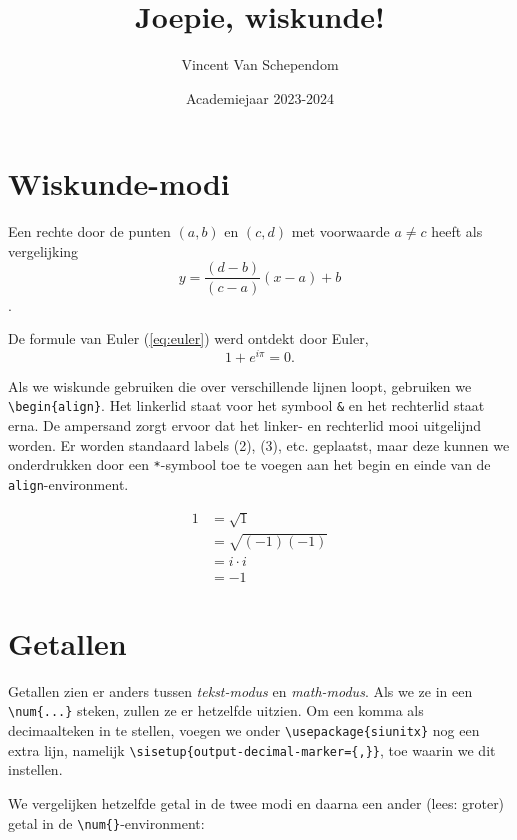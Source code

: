 \documentclass{article}
\title{Joepie, wiskunde!}
\author{Vincent Van Schependom}
\date{Academiejaar 2023-2024}
\begin{document}
	
	\maketitle
	
	\section{Wiskunde-modi}
	
	Een rechte door de punten \((a,b)\) en \((c,d)\) met voorwaarde \(a \neq c\) heeft als vergelijking \[y = \frac{(d-b)}{(c-a)}(x-a)+b\].
	
	De formule van Euler (\ref{eq:euler}) werd ontdekt door Euler,
	\begin{equation}
		\label{eq:euler}
		1+e^{i\pi}=0.
	\end{equation}
	
	Als we wiskunde gebruiken die over verschillende lijnen loopt, gebruiken we \verb|\begin{align}|. Het linkerlid staat voor het symbool \texttt{\&} en het rechterlid staat erna. De ampersand zorgt ervoor dat het linker- en rechterlid mooi uitgelijnd worden. Er worden standaard labels (2), (3), etc. geplaatst, maar deze kunnen we onderdrukken door een \texttt{*}-symbool toe te voegen aan het begin en einde van de \texttt{align}-environment.
		
	\begin{align*}
		1 & = \sqrt{1} \\
			& = \sqrt{ (-1)(-1) } \\
			& = i \cdot i \\
			& = -1
	\end{align*}
	
	\section{Getallen}
	
	Getallen zien er anders tussen \textit{tekst-modus} en \textit{math-modus}. Als we ze in een \verb*|\num{...}| steken, zullen ze er hetzelfde uitzien. Om een komma als decimaalteken in te stellen, voegen we onder \verb*|\usepackage{siunitx}| nog een extra lijn, namelijk \verb*|\sisetup{output-decimal-marker={,}}|, toe waarin we dit instellen.
	
	We vergelijken hetzelfde getal in de twee modi en daarna een ander (lees: groter) getal in de \verb*|\num{}|-environment:
	
\end{document}
